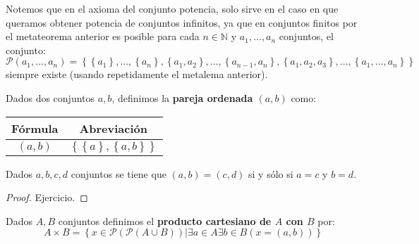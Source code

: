 \documentclass[12pt]{report}
\newcounter{it}
\theoremstyle{largebreak}
\newcommand\pot[1]{\ensuremath{\mathcal{P}\left(#1\right)}}
\begin{document}
    \begin{obs}
        Notemos que en el axioma del conjunto potencia, solo sirve en el caso en que queramos obtener potencia de conjuntos infinitos, ya que en conjuntos finitos por el metateorema anterior es posible para cada $n\in\mathbb{N}$ y $a_1,...,a_n$ conjuntos, el conjunto:
        \begin{equation*}
            \pot{a_1,...,a_n}=\left\{\left\{a_1 \right\},...,\left\{a_n \right\},\left\{a_1,a_2 \right\},...,\left\{a_{ n-1},a_n \right\},\left\{a_1,a_2,a_3\right\},...,\left\{a_1,...,a_n \right\} \right\}
        \end{equation*}
        siempre existe (usando repetidamente el metalema anterior).
    \end{obs}

    \begin{mydef}
        Dados dos conjuntos $a,b$, definimos la \textbf{pareja ordenada $(a,b)$} como:
        \begin{center}
            \begin{tabular}{cc}
                \hline
                Fórmula & Abreviación \\
                \hline
                $(a,b)$ & $\left\{\left\{a \right\},\left\{a,b \right\} \right\}$ \\
                \hline
            \end{tabular}
        \end{center}
    \end{mydef}

    \begin{excer}
        Dados $a,b,c,d$ conjuntos se tiene que $(a,b)=(c,d)$ si y sólo si $a=c$ y $b=d$.
    \end{excer}

    \begin{proof}
        Ejercicio.
    \end{proof}

    \begin{mydef}
        Dados $A,B$ conjuntos definimos el \textbf{producto cartesiano de $A$ con $B$} por:
        \begin{equation*}
            A\times B=\left\{x\in\pot{\pot{A\cup B}} \Big| \exists a\in A\exists b\in B(x=(a,b)) \right\}
        \end{equation*}
    \end{mydef}
        
\end{document}

